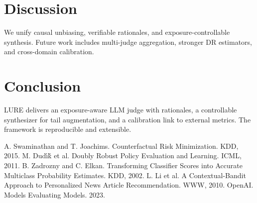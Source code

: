 \documentclass[sigconf,anonymous,review]{acmart}
\begin{document}
\section{Discussion}
We unify causal unbiasing, verifiable rationales, and exposure-controllable synthesis. Future work includes multi-judge aggregation, stronger DR estimators, and cross-domain calibration.

\section{Conclusion}
LURE delivers an exposure-aware LLM judge with rationales, a controllable synthesizer for tail augmentation, and a calibration link to external metrics. The framework is reproducible and extensible.


\begin{thebibliography}{9}
 A. Swaminathan and T. Joachims. Counterfactual Risk Minimization. KDD, 2015.
 M. Dud\'\i\v{k} et al. Doubly Robust Policy Evaluation and Learning. ICML, 2011.
 B. Zadrozny and C. Elkan. Transforming Classifier Scores into Accurate Multiclass Probability Estimates. KDD, 2002.
 L. Li et al. A Contextual-Bandit Approach to Personalized News Article Recommendation. WWW, 2010.
 OpenAI. Models Evaluating Models. 2023.
\end{thebibliography}
\end{document}

